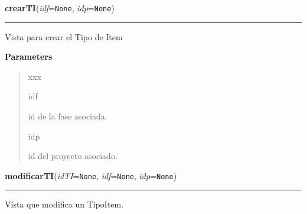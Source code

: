     \label{app:vista:vistaTI:crearTI}

    \vspace{0.5ex}

\hspace{.8\funcindent}\begin{boxedminipage}{\funcwidth}

    \raggedright \textbf{crearTI}(\textit{idf}={\tt None}, \textit{idp}={\tt None})

    \vspace{-1.5ex}

    \rule{\textwidth}{0.5\fboxrule}
\setlength{\parskip}{2ex}
    Vista para crear el Tipo de Item

\setlength{\parskip}{1ex}
      \textbf{Parameters}
      \vspace{-1ex}

      \begin{quote}
        \begin{Ventry}{xxx}

          \item[idf]

          id de la fase asociada.

          \item[idp]

          id del proyecto asociado.

        \end{Ventry}

      \end{quote}

    \end{boxedminipage}

    \label{app:vista:vistaTI:modificarTI}

    \vspace{0.5ex}

\hspace{.8\funcindent}\begin{boxedminipage}{\funcwidth}

    \raggedright \textbf{modificarTI}(\textit{idTI}={\tt None}, \textit{idf}={\tt None}, \textit{idp}={\tt None})

    \vspace{-1.5ex}

    \rule{\textwidth}{0.5\fboxrule}
\setlength{\parskip}{2ex}
    Vista que modifica un TipoItem.

\setlength{\parskip}{1ex}
    \end{boxedminipage}

